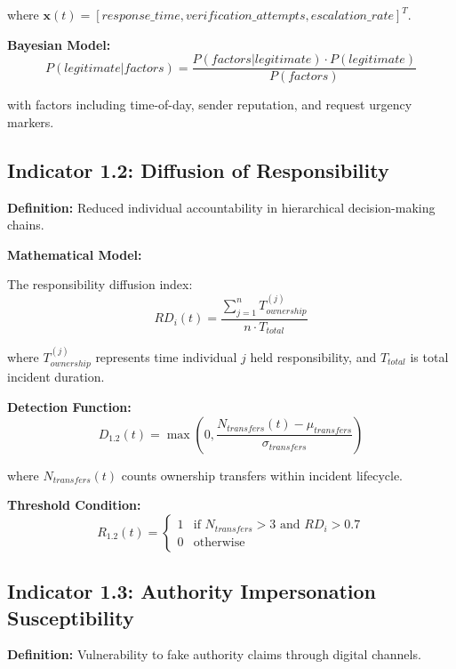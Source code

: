 \documentclass[11pt,a4paper]{article}
\begin{document}
where $\mathbf{x}(t) = [response\_time, verification\_attempts, escalation\_rate]^T$.

\textbf{Bayesian Model:}
\begin{equation}
P(legitimate|factors) = \frac{P(factors|legitimate) \cdot P(legitimate)}{P(factors)}
\end{equation}

with factors including time-of-day, sender reputation, and request urgency markers.

\subsection{Indicator 1.2: Diffusion of Responsibility}

\textbf{Definition:} Reduced individual accountability in hierarchical decision-making chains.

\textbf{Mathematical Model:}

The responsibility diffusion index:
\begin{equation}
RD_i(t) = \frac{\sum_{j=1}^{n} T_{ownership}^{(j)}}{n \cdot T_{total}}
\end{equation}

where $T_{ownership}^{(j)}$ represents time individual $j$ held responsibility, and $T_{total}$ is total incident duration.

\textbf{Detection Function:}
\begin{equation}
D_{1.2}(t) = \max\left(0, \frac{N_{transfers}(t) - \mu_{transfers}}{\sigma_{transfers}}\right)
\end{equation}

where $N_{transfers}(t)$ counts ownership transfers within incident lifecycle.

\textbf{Threshold Condition:}
\begin{equation}
R_{1.2}(t) = \begin{cases}
1 & \text{if } N_{transfers} > 3 \text{ and } RD_i > 0.7 \\
0 & \text{otherwise}
\end{cases}
\end{equation}

\subsection{Indicator 1.3: Authority Impersonation Susceptibility}

\textbf{Definition:} Vulnerability to fake authority claims through digital channels.
\end{document}
